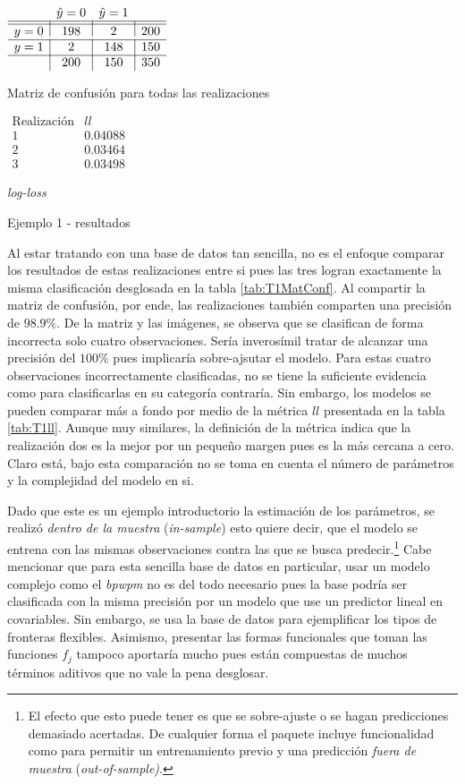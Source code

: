 \documentclass[../Main/Main.tex]{subfiles}
\begin{document}
\begin{table}[h]
\begin{subtable}[t]{0.45\textwidth}
	\centering
	$\begin{array}{l|c|c|l} ~ & \hat{y} = 0 & \hat{y} = 1 & ~ \\ \hline\hline y = 0 & 198 & 2 & 200 \\ \hline y = 1 & 2 & 148 & 150 \\ \hline ~ & 200 & 150 & 350 \end{array}$
	\caption{Matriz de confusión para todas las realizaciones}
	\label{tab:T1MatConf}
\end{subtable}
\hfill
\begin{subtable}[t]{0.45\textwidth}
	\centering
	$\begin{array}{c|c}
		\text{Realización} & ll \\ \hline\hline
		1 & 0.04088 \\
		2 & 0.03464 \\
		3 & 0.03498
	\end{array}$
	\caption{\textit{log-loss}}
	\label{tab:T1ll}
\end{subtable}
\caption{Ejemplo 1 - resultados}
\label{tab:T1Resultados}
\end{table}
Al estar tratando con una base de datos tan sencilla, no es el enfoque comparar los resultados de estas realizaciones entre si pues las tres logran exactamente la misma clasificación desglosada en la tabla \ref{tab:T1MatConf}. Al compartir la matriz de confusión, por ende, las realizaciones también comparten una precisión de $98.9\%$. De la matriz y las imágenes, se observa que se clasifican de forma incorrecta solo cuatro observaciones. Sería inverosímil tratar de alcanzar una precisión del $100\%$ pues implicaría sobre-ajsutar el modelo. Para estas cuatro observaciones incorrectamente clasificadas, no se tiene la suficiente evidencia como para clasificarlas en su categoría contraría. Sin embargo, los modelos se pueden comparar más a fondo por medio de la métrica $ll$ presentada en la tabla \ref{tab:T1ll}. Aunque muy similares, la definición de la métrica indica que la realización dos es la mejor por un pequeño margen pues es la más cercana a cero. Claro está, bajo esta comparación no se toma en cuenta el número de parámetros y la complejidad del modelo en si.

Dado que este es un ejemplo introductorio la estimación de los parámetros, se realizó \textit{dentro de la muestra} (\textit{in-sample}) esto quiere decir, que el modelo se entrena con las mismas observaciones contra las que se busca predecir.\footnote{El efecto que esto puede tener es que se sobre-ajuste o se hagan predicciones demasiado acertadas. De cualquier forma el paquete incluye funcionalidad como para permitir un entrenamiento previo y una predicción \textit{fuera de muestra} (\textit{out-of-sample)}.} Cabe mencionar que para esta sencilla base de datos en particular, usar un modelo complejo como el \textit{bpwpm} no es del todo necesario pues la base podría ser clasificada con la misma precisión por un modelo que use un predictor lineal en covariables. Sin embargo, se usa la base de datos para ejemplificar los tipos de fronteras flexibles. Asimismo, presentar las formas funcionales que toman las funciones $f_j$ tampoco aportaría mucho pues están compuestas de muchos términos aditivos que no vale la pena desglosar. 
\end{document}

